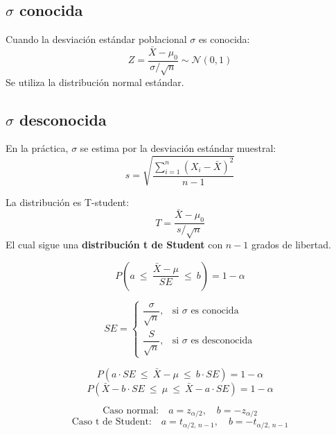 \documentclass[12pt]{article}
\begin{document}
\subsection{$\sigma$ conocida}
Cuando la desviación estándar poblacional $\sigma$ es conocida:
\[
Z = \frac{\bar{X} - \mu_0}{\sigma / \sqrt{n}} \sim \mathcal{N}(0,1)
\]
Se utiliza la distribución normal estándar.

\subsection{$\sigma$ desconocida}
En la práctica, $\sigma$ se estima por la desviación estándar muestral:
\[
s = \sqrt{\frac{\sum_{i=1}^n (X_i - \bar{X})^2}{n-1}}
\]

La distribución es T-student:
\[
T = \frac{\bar{X} - \mu_0}{s / \sqrt{n}}
\]
El cual sigue una \textbf{distribución t de Student} con $n-1$ grados de libertad.

\vspace{4cm}

\[ P\left( a \ \le \ \frac{\bar{X} - \mu}{SE} \ \le \ b \right) = 1 - \alpha\]

\[
SE =
\begin{cases}
\dfrac{\sigma}{\sqrt{n}}, & \text{si } \sigma \text{ es conocida} \\
\dfrac{S}{\sqrt{n}}, & \text{si } \sigma \text{ es desconocida}
\end{cases}
\]

\[
P\left( a \cdot SE \ \le \ \bar{X} - \mu \ \le \ b \cdot SE \right) = 1 - \alpha
\]
\[
P\left( \bar{X} - b \cdot SE \ \le \ \mu \ \le \ \bar{X} - a \cdot SE \right) = 1 - \alpha
\]

\[
\text{Caso normal:} \quad a = z_{\alpha/2}, \quad b = -z_{\alpha/2}
\]
\[
\text{Caso t de Student:} \quad a = t_{\alpha/2,\,n-1}, \quad b =-t_{\alpha/2,\,n-1}
\]
\end{document}
